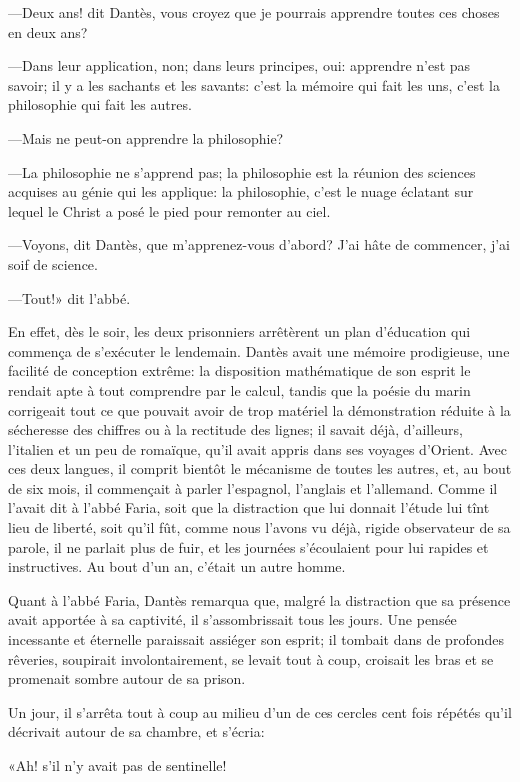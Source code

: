 —Deux ans! dit Dantès, vous croyez que je pourrais apprendre toutes ces choses en deux ans?

—Dans leur application, non; dans leurs principes, oui: apprendre n'est pas savoir; il y a les sachants et les savants: c'est la mémoire qui fait les uns, c'est la philosophie qui fait les autres.

—Mais ne peut-on apprendre la philosophie?

—La philosophie ne s'apprend pas; la philosophie est la réunion des sciences acquises au génie qui les applique: la philosophie, c'est le nuage éclatant sur lequel le Christ a posé le pied pour remonter au ciel.

—Voyons, dit Dantès, que m'apprenez-vous d'abord? J'ai hâte de commencer, j'ai soif de science.

—Tout!» dit l'abbé.

En effet, dès le soir, les deux prisonniers arrêtèrent un plan d'éducation qui commença de s'exécuter le lendemain. Dantès avait une mémoire prodigieuse, une facilité de conception extrême: la disposition mathématique de son esprit le rendait apte à tout comprendre par le calcul, tandis que la poésie du marin corrigeait tout ce que pouvait avoir de trop matériel la démonstration réduite à la sécheresse des chiffres ou à la rectitude des lignes; il savait déjà, d'ailleurs, l'italien et un peu de romaïque, qu'il avait appris dans ses voyages d'Orient. Avec ces deux langues, il comprit bientôt le mécanisme de toutes les autres, et, au bout de six mois, il commençait à parler l'espagnol, l'anglais et l'allemand. Comme il l'avait dit à l'abbé Faria, soit que la distraction que lui donnait l'étude lui tînt lieu de liberté, soit qu'il fût, comme nous l'avons vu déjà, rigide observateur de sa parole, il ne parlait plus de fuir, et les journées s'écoulaient pour lui rapides et instructives. Au bout d'un an, c'était un autre homme.

Quant à l'abbé Faria, Dantès remarqua que, malgré la distraction que sa présence avait apportée à sa captivité, il s'assombrissait tous les jours. Une pensée incessante et éternelle paraissait assiéger son esprit; il tombait dans de profondes rêveries, soupirait involontairement, se levait tout à coup, croisait les bras et se promenait sombre autour de sa prison.

Un jour, il s'arrêta tout à coup au milieu d'un de ces cercles cent fois répétés qu'il décrivait autour de sa chambre, et s'écria:

«Ah! s'il n'y avait pas de sentinelle!

